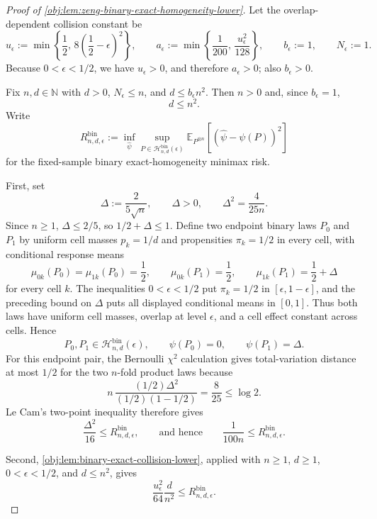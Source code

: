 \documentclass[11pt]{article}
\begin{document}
\begin{proof}[Proof of \cref{obj:lem:zeng-binary-exact-homogeneity-lower}]
Let the overlap-dependent collision constant be
\[
u_\epsilon:=\min\left\{\frac12,\,8\left(\frac12-\epsilon\right)^2\right\},
\qquad
a_\epsilon:=\min\left\{\frac1{200},\,\frac{u_\epsilon^2}{128}\right\},
\qquad
b_\epsilon:=1,
\qquad
N_\epsilon:=1 .
\]
Because \(0<\epsilon<1/2\), we have \(u_\epsilon>0\), and therefore \(a_\epsilon>0\); also \(b_\epsilon>0\).

Fix \(n,d\in\mathbb N\) with \(d>0\), \(N_\epsilon\le n\), and \(d\le b_\epsilon n^2\).  Then \(n>0\) and, since \(b_\epsilon=1\),
\[
d\le n^2 .
\]
Write
\[
R_{n,d,\epsilon}^{\mathrm{bin}}
:=
\inf_{\widehat\psi}
\sup_{P\in\mathcal H_{n,d}^{\mathrm{bin}}(\epsilon)}
\mathbb E_{P^{\otimes n}}\!\left[(\widehat\psi-\psi(P))^2\right]
\]
for the fixed-sample binary exact-homogeneity minimax risk.

First, set
\[
\Delta:=\frac{2}{5\sqrt n},
\qquad
\Delta>0,
\qquad
\Delta^2=\frac{4}{25n}.
\]
Since \(n\ge1\), \(\Delta\le2/5\), so \(1/2+\Delta\le1\).  Define two endpoint binary laws \(P_0\) and \(P_1\) by uniform cell masses \(p_k=1/d\) and propensities \(\pi_k=1/2\) in every cell, with conditional response means
\[
\mu_{0k}(P_0)=\mu_{1k}(P_0)=\frac12,
\qquad
\mu_{0k}(P_1)=\frac12,
\qquad
\mu_{1k}(P_1)=\frac12+\Delta
\]
for every cell \(k\).  The inequalities \(0<\epsilon<1/2\) put \(\pi_k=1/2\) in \([\epsilon,1-\epsilon]\), and the preceding bound on \(\Delta\) puts all displayed conditional means in \([0,1]\).  Thus both laws have uniform cell masses, overlap at level \(\epsilon\), and a cell effect constant across cells.  Hence
\[
P_0,P_1\in\mathcal H_{n,d}^{\mathrm{bin}}(\epsilon),
\qquad
\psi(P_0)=0,
\qquad
\psi(P_1)=\Delta .
\]
For this endpoint pair, the Bernoulli \(\chi^2\) calculation gives total-variation distance at most \(1/2\) for the two \(n\)-fold product laws because
\[
n\,
\frac{(1/2)\Delta^2}{(1/2)(1-1/2)}
=
\frac{8}{25}
\le \log 2 .
\]
Le Cam's two-point inequality therefore gives
\[
\frac{\Delta^2}{16}
\le
R_{n,d,\epsilon}^{\mathrm{bin}},
\qquad\text{and hence}\qquad
\frac{1}{100n}
\le
R_{n,d,\epsilon}^{\mathrm{bin}} .
\]

Second, \cref{obj:lem:binary-exact-collision-lower}, applied with \(n\ge1\), \(d\ge1\), \(0<\epsilon<1/2\), and \(d\le n^2\), gives
\[
\frac{u_\epsilon^2}{64}\frac{d}{n^2}
\le
R_{n,d,\epsilon}^{\mathrm{bin}} .
\]


\end{proof}
\end{document}
